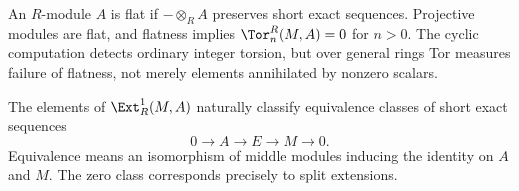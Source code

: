 \documentclass[11pt]{article}
\begin{document}
\begin{remark}
An $R$-module $A$ is flat if $-\otimes_R A$ preserves short exact sequences. Projective modules are flat, and flatness implies $\Tor_n^R(M,A)=0$ for $n>0$. The cyclic computation detects ordinary integer torsion, but over general rings Tor measures failure of flatness, not merely elements annihilated by nonzero scalars.
\end{remark}

\begin{proposition}\label{prop:extensions}
The elements of $\Ext_R^1(M,A)$ naturally classify equivalence classes of short exact sequences
\[
0\longrightarrow A\longrightarrow E\longrightarrow M\longrightarrow0.
\]
Equivalence means an isomorphism of middle modules inducing the identity on $A$ and $M$. The zero class corresponds precisely to split extensions.
\end{proposition}
\end{document}
